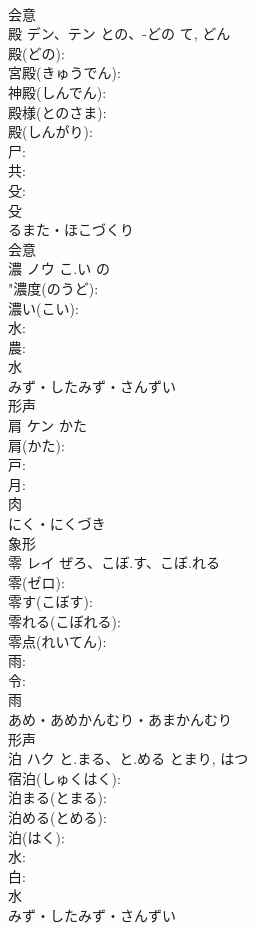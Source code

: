 \documentclass[8pt]{extreport}
\begin{document}
\begin{CJK}{UTF8}{min}
\\	会意 
\\	殿	デン、テン	との、-どの	て, どん	
\\	殿(どの): 
\\	宮殿(きゅうでん): 
\\	神殿(しんでん): 
\\	殿様(とのさま): 
\\	殿(しんがり): 
\\	尸: 
\\	共: 
\\	殳: 
\\	殳	
\\	るまた・ほこづくり	
\\	会意 
\\	濃	ノウ	こ.い	の	
\\	"濃度(のうど): 
\\	濃い(こい): 
\\	水: 
\\	農: 
\\	水	
\\	みず・したみず・さんずい	
\\	形声 
\\	肩	ケン	かた		
\\	肩(かた): 
\\	戸: 
\\	月: 
\\	肉	
\\	にく・にくづき	
\\	象形 
\\	零	レイ	ぜろ、こぼ.す、こぼ.れる		
\\	零(ゼロ): 
\\	零す(こぼす): 
\\	零れる(こぼれる): 
\\	零点(れいてん): 
\\	雨: 
\\	令: 
\\	雨	
\\	あめ・あめかんむり・あまかんむり	
\\	形声 
\\	泊	ハク	と.まる、と.める	とまり, はつ	
\\	宿泊(しゅくはく): 
\\	泊まる(とまる): 
\\	泊める(とめる): 
\\	泊(はく): 
\\	水: 
\\	白: 
\\	水	
\\	みず・したみず・さんずい	

\end{CJK}
\end{document}
